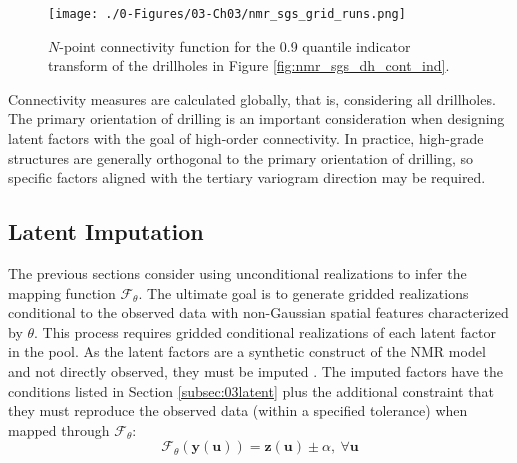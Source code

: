 \begin{figure}[htb!]
    \centering
    \texttt{[image: ./0-Figures/03-Ch03/nmr\_sgs\_grid\_runs.png]}
    \caption{ $N$-point connectivity function for the 0.9 quantile indicator transform of the drillholes in Figure \ref{fig:nmr_sgs_dh_cont_ind}.}
    \label{fig:nmr_sgs_grid_runs}
\end{figure}

Connectivity measures are calculated globally, that is, considering all drillholes. The primary orientation of drilling is an important consideration when designing latent factors with the goal of high-order connectivity. In practice, high-grade structures are generally orthogonal to the primary orientation of drilling, so specific factors aligned with the tertiary variogram direction may be required.

\subsection{Latent Imputation}
\label{subsec:03impute}

The previous sections consider using unconditional realizations to infer the mapping function $\mathcal{F}_{\theta}$. The ultimate goal is to generate gridded realizations conditional to the observed data with non-Gaussian spatial features characterized by $\theta$. This process requires gridded conditional realizations of each latent factor in the pool. As the latent factors are a synthetic construct of the \gls{NMR} model and not directly observed, they must be imputed \citep{little2019statistical}. The imputed factors have the conditions listed in Section \ref{subsec:03latent} plus the additional constraint that they must reproduce the observed data (within a specified tolerance) when mapped through $\mathcal{F}_{\theta}$:
\begin{equation}
    \mathcal{F}_{\theta}(\mathbf{y}(\mathbf{u})) = \mathbf{z}(\mathbf{u}) \pm \alpha, \ \forall \mathbf{u}
    \label{eq:ftheta0}
\end{equation}

